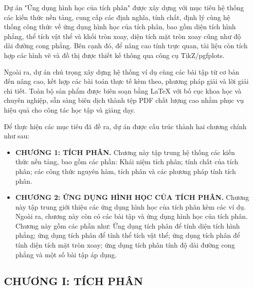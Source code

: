 \documentclass{article}
\begin{document}
\vspace{1cm}

\hspace{1cm} Dự án "Ứng dụng hình học của tích phân" được xây dựng với mục tiêu hệ thống các kiến thức nền tảng, cung cấp các định nghĩa, tính chất, định lý cùng hệ thống công thức về ứng dụng hình học của tích phân, bao gồm diện tích hình phẳng, thể tích vật thể và khối tròn xoay, diện tích mặt tròn xoay cũng như độ dài đường cong phẳng. Bên cạnh đó, để nâng cao tính trực quan, tài liệu còn tích hợp các hình vẽ và đồ thị được thiết kế thông qua công cụ TikZ/pgfplots.

\vspace{0.5cm} %

\hspace{1cm} Ngoài ra, dự án chú trọng xây dựng hệ thống ví dụ cùng các bài tập từ cơ bản đến nâng cao, kết hợp các bài toán thực tế kèm theo, phương pháp giải và lời giải chi tiết. Toàn bộ sản phẩm được biên soạn bằng LaTeX với bố cục khoa học và chuyên nghiệp, sẵn sàng biên dịch thành tệp PDF chất lượng cao nhằm phục vụ hiệu quả cho công tác học tập và giảng dạy.

\vspace{0.5cm} %

\hspace{1cm}\vspace{0.3cm}
\noindent Để thực hiện các mục tiêu đã đề ra, dự án được cấu trúc thành hai chương chính như sau:

\begin{itemize}
    \item \textbf{CHƯƠNG 1: TÍCH PHÂN.} Chương này tập trung hệ thống các kiến thức nền tảng, bao gồm các phần: Khái niệm tích phân; tính chất của tích phân; các công thức nguyên hàm, tích phân và các phương pháp tính tích phân.
    \item \textbf{CHƯƠNG 2: ỨNG DỤNG HÌNH HỌC CỦA TÍCH PHÂN.} Chương này tập trung giới thiệu các ứng dụng hình học của tích phân kèm các ví dụ. Ngoài ra, chương này còn có các bài tập và ứng dụng hình học của tích phân. Chương này gồm các phần như: Ứng dụng tích phân để tính diện tích hình phẳng; ứng dụng tích phân để tính thể tích vật thể; ứng dụng tích phân để tính diện tích mặt tròn xoay; ứng dụng tích phân tính độ dài đường cong phẳng và một số bài tập áp dụng.
\end{itemize}

\newpage
\begin{center}
\section*{CHƯƠNG I: TÍCH PHÂN}
\end{center}
\end{document}
